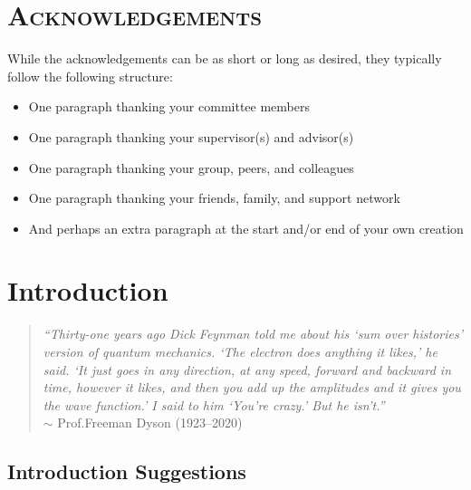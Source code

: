 \documentclass[12pt,letterpaper,oneside,titlepage,final]{dalthesis}
\numberwithin{equation}{section}
\begin{document}
\chapter*{\centering\large\textsc{Acknowledgements}} 

While the acknowledgements can be as short or long as desired, they typically follow the following structure:
\begin{itemize}
\item One paragraph thanking your committee members
\item One paragraph thanking your supervisor(s) and advisor(s)
\item One paragraph thanking your group, peers, and colleagues
\item One paragraph thanking your friends, family, and support network
\item And perhaps an extra paragraph at the start and/or end of your own creation
\end{itemize}

\clearpage




\pagestyle{Body}  
\chapter{Introduction} \label{Introduction} \thispagestyle{Chapter}
\begin{quote}
\textsl{``Thirty-one years ago Dick Feynman told me about his `sum over histories' version of quantum mechanics. `The electron does anything it likes,' he said. `It just goes in any direction, at any speed, forward and backward in time, however it likes, and then you add up the amplitudes and it gives you the wave function.' I said to him `You're crazy.' But he isn't.''} \cite{rioux2023quantum} \\ 
$\sim$ Prof.\@ Freeman Dyson (1923--2020)
\end{quote}
\vspace*{0.5cm}

\section{Introduction Suggestions} \label{C1:Suggestions} 
\end{document}
